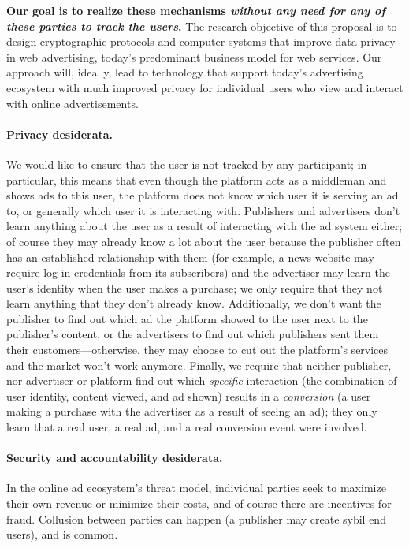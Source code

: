 \textbf{
Our goal is to realize these mechanisms \emph{without any need for any of these parties to track the users}.} 
The research objective of this proposal is to design cryptographic protocols and
computer systems that improve data privacy in web advertising, today's
predominant business model for web services.
%
Our approach will, ideally, lead to technology that support today's advertising
ecosystem with much improved privacy for individual users who view and
interact with online advertisements.
%

\paragraph{Privacy desiderata.}
%
We would like to ensure that the user is not tracked by any participant; in particular, this means that even though the platform acts as a middleman and shows ads to this user, the platform does not know which user it is serving an ad to, or generally which user it is interacting with.
%
Publishers and advertisers don't learn anything about the user as a result of interacting with the ad system either; of course they may already know a lot about the user because the publisher often has an established relationship with them (for example, a news website may require log-in credentials from its subscribers) and the advertiser may learn the user's identity when the user makes a purchase; we only require that they not learn anything that they don't already know.
%
Additionally, we don't want the publisher to find out which ad the platform showed to the user next to the publisher's content, or the advertisers to find out which publishers sent them their customers---otherwise, they may choose to cut out the platform's services and the market won't work anymore.
%
Finally, we require that  neither publisher, nor advertiser or platform find out which \emph{specific} interaction (the combination of user identity, content viewed, and ad shown) results in a \emph{conversion} (a user making a purchase with the advertiser as a result of seeing an ad); they only learn that a real user, a real ad, and a real conversion event were involved.
%


\paragraph{Security and accountability desiderata.}
%
%
In the online ad ecosystem's threat model, individual parties seek to maximize
their own revenue or minimize their costs, and of course there are incentives for fraud.
%
Collusion between parties can happen (\eg a publisher may create sybil end
users), and is common.
%

